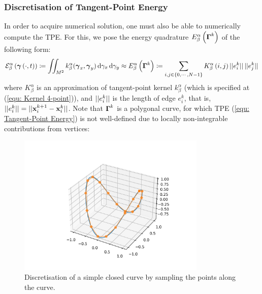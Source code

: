 \documentclass[../dissertation.tex]{subfiles}
\begin{document}
\subsubsection{Discretisation of Tangent-Point Energy}
In order to acquire numerical solution, one must also be able to numerically compute the TPE.
For this, we pose the energy quadrature $E_{\beta}^{\alpha} \left( \boldsymbol{\Gamma}^k \right)$ of the following form:
\begin{equation}
    \mathcal{E}_{\beta}^{\alpha} \left( \boldsymbol{\gamma} \left( \cdot, t \right) \right) \coloneqq
    \iint_{M^2} k_{\beta}^{\alpha} (\boldsymbol{\gamma}_x, \boldsymbol{\gamma}_y) \, \text{d} \gamma_x \, \text{d} \gamma_y
    \approx
    E_{\beta}^{\alpha} \left( \boldsymbol{\Gamma}^k \right) \coloneqq
    \sum_{i, j \in \left\{ 0, \cdots, N-1 \right\}} K_{\beta}^{\alpha} \left( i, j \right) \lvert \lvert e_i^k \rvert \rvert \, \lvert \lvert e_j^k \rvert \rvert
    \label{equ: Energy Approximation Form}
\end{equation}
where
$K_{\beta}^{\alpha}$ is an approximation of tangent-point kernel $k_{\beta}^{\alpha}$ (which is specified at (\ref{equ: Kernel 4-point})), 
and $\lvert \lvert e_i^k \rvert \rvert$ is the length of edge $e_i^k$, that is, $\lvert \lvert e_i^k \rvert \rvert = \lvert \lvert \mathbf{x}_i^{k+1} - \mathbf{x}_i^k \rvert \rvert$.
Note that $\boldsymbol{\Gamma}^k$ is a polygonal curve, for which TPE (\ref{equ: Tangent-Point Energy}) is not well-defined due to locally non-integrable contributions from vertices:

\begin{figure}[tbp]
    \centering
    \includegraphics[width=0.8\textwidth]{sections/discretizationImgs/discretization}
    \caption{Discretisation of a simple closed curve by sampling the points along the curve.}
    \label{fig: Discretization of Curve}
\end{figure}
\end{document}
